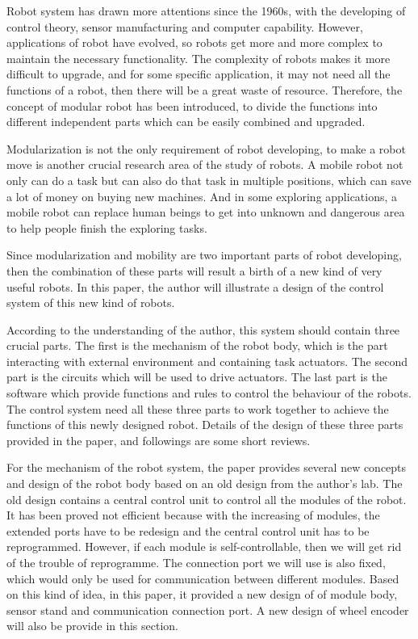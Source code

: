 
\begin{bigabstract}

Robot system has drawn more attentions since the 1960s, with the developing of control theory, sensor manufacturing and computer capability. However, applications of robot have evolved, so robots get more and more complex to maintain the necessary functionality. The complexity of robots makes it more difficult to upgrade, and for some specific application, it may not need all the functions of a robot, then there will be a great waste of resource. Therefore, the concept of modular robot has been introduced, to divide the functions into different independent parts which can be easily combined and upgraded.

Modularization is not the only requirement of robot developing, to make a robot move is another crucial research area of  the study of robots. A mobile robot not only can do a task but can also do that task in multiple positions, which can save a lot of money on buying new machines. And in some exploring applications, a mobile robot can replace human beings to get into unknown and dangerous area to help people finish the exploring tasks. 

Since modularization and mobility are two important parts of robot developing, then the combination of these parts will result a birth of a new kind of very useful robots. In this paper, the author will illustrate a design of the control system of this new kind of robots.

According to the understanding of the author, this system should contain three crucial parts. The first is the mechanism of the robot body, which is the part interacting with external environment and containing task actuators. The second part is the circuits which will be used to drive actuators. The last part is the software which provide functions and rules to control the behaviour of the robots. The control system need all these three parts to work together to achieve the functions of this newly designed robot. Details of the design of these three parts provided in the paper, and followings are some short reviews.

For the mechanism of the robot system, the paper provides several new concepts and  design of the robot body based on an old design from the author's lab. The old design contains a central control unit to control all the modules of the robot. It has been proved not efficient because with the increasing of modules, the extended ports have to be redesign and the central control unit has to be reprogrammed. However, if each module is self-controllable, then we will get rid of the trouble of reprogramme. The connection port we will use is also fixed, which would only be used for communication between different modules. Based on this kind of idea, in this paper, it provided a new design of of module body, sensor stand and communication connection port. A new design of wheel encoder will also be provide in this section.


\end{bigabstract}
